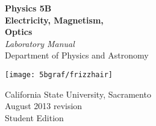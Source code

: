 
\thispagestyle{empty}		%
\begin{fullwidth}

\vspace*{\baselineskip} 

\begin{centering}
		{\noindent\HUGE\bfseries  Physics 5B\\[0.5\baselineskip] 
		Electricity, Magnetism,\\ Optics}\\[2\baselineskip] 
		{\huge\itshape Laboratory Manual}\\[4\baselineskip] 
		{\LARGE Department of Physics and Astronomy}\par
		\texttt{[image: 5bgraf/frizzhair]} \par
		{\noindent \Large {California State University, Sacramento\\
		August 2013 revision\\[2\baselineskip]  \LARGE Student Edition}}\\
		[3\baselineskip] 
\end{centering}
\end{fullwidth}
\clearpage
